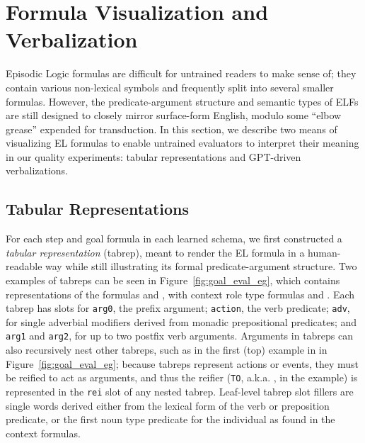 \section{Formula Visualization and Verbalization}
\label{sec:verbviz}
Episodic Logic formulas are difficult for untrained readers to make sense of; they contain various non-lexical symbols and frequently split into several smaller formulas. However, the predicate-argument structure and semantic types of ELFs are still designed to closely mirror surface-form English, modulo some ``elbow grease'' expended for transduction. In this section, we describe two means of visualizing EL formulas to enable untrained evaluators to interpret their meaning in our quality experiments: tabular representations and GPT-driven verbalizations.

\subsection{Tabular Representations}

For each step and goal formula in each learned schema, we first constructed a \textit{tabular representation} (tabrep), meant to render the EL formula in a human-readable way while still illustrating its formal predicate-argument structure. Two examples of tabreps can be seen in Figure~\ref{fig:goal_eval_eg}, which contains representations of the formulas  and , with context role type formulas  and . Each tabrep has slots for \texttt{arg0}, the prefix argument; \texttt{action}, the verb predicate; \texttt{adv}, for single adverbial modifiers derived from monadic prepositional predicates; and \texttt{arg1} and \texttt{arg2}, for up to two postfix verb arguments. Arguments in tabreps can also recursively nest other tabreps, such as in the first (top) example in in Figure~\ref{fig:goal_eval_eg}; because tabreps represent actions or events, they must be reified to act as arguments, and thus the reifier (\texttt{TO}, a.k.a. , in the example) is represented in the \texttt{rei} slot of any nested tabrep. Leaf-level tabrep slot fillers are single words derived either from the lexical form of the verb or preposition predicate, or the first noun type predicate for the individual as found in the context formulas.

